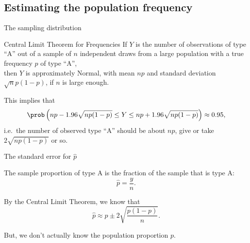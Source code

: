 \subsection{Estimating the population frequency}

\begin{frame}{The sampling distribution}

    \begin{block}{Central Limit Theorem for Frequencies}
        If $Y$ is the number of observations of type ``A''
        out of a sample of $n$ independent draws
        from a large population with a true frequency $p$ of type ``A'', \\
        then $Y$ is \alert{approximately Normal},
        with mean $np$ and standard deviation $\sqrt{n} p (1-p)$,
        if $n$ is large enough.
    \end{block}

    \vspace{2em}

    This implies that 
    \[ \prob\left( np - 1.96 \sqrt{n p(1-p)} \le Y \le np + 1.96 \sqrt{n p (1-p)} \right) \approx 0.95 , \]
    i.e.\ the number of observed type ``A'' should be about $np$, give or take $2 \sqrt{n p (1-p)}$ or so.

    \vspace{2em}


\end{frame}

\begin{frame}{The standard error for $\hat p$}

    The \alert{sample proportion} of type A is
    the fraction of the sample that is type A:
    \[ \hat p = \frac{y}{n} . \]

    \vspace{2em}

    By the Central Limit Theorem, we know that 
    \[  \hat p \approx p \pm 2 \sqrt{ \frac{ p(1-p) }{ n } } .\]

    \vspace{2em}

    But, we don't actually know the population proportion $p$.

\end{frame}

